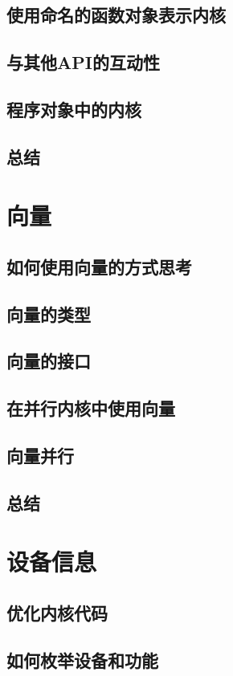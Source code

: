 \documentclass[11pt,a4paper,UTF8]{ctexart}
\begin{document}
		\subsection{使用命名的函数对象表示内核}
		\subsection{与其他API的互动性}
		\subsection{程序对象中的内核}
		\subsection{总结}
	\section{向量}
		\subsection{如何使用向量的方式思考}
		\subsection{向量的类型}
		\subsection{向量的接口}
		\subsection{在并行内核中使用向量}
		\subsection{向量并行}
		\subsection{总结}
	\section{设备信息}
		\subsection{优化内核代码}
		\subsection{如何枚举设备和功能}
\end{document}
